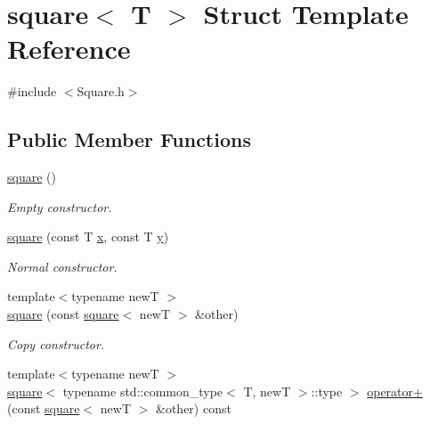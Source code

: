 \hypertarget{structsquare}{}\section{square$<$ T $>$ Struct Template Reference}
\label{structsquare}


{\ttfamily \#include $<$Square.\+h$>$}

\subsection*{Public Member Functions}
\begin{DoxyCompactItemize}
\item 
\mbox{\label{structsquare_a671bc7b982fc848ab1222ead8512469e}} 
\hyperlink{structsquare_a671bc7b982fc848ab1222ead8512469e}{square} ()
\begin{DoxyCompactList}\small\item\em Empty constructor. \end{DoxyCompactList}\item 
\mbox{\label{structsquare_a447dd893d605937230bba2861322df6d}} 
\hyperlink{structsquare_a447dd893d605937230bba2861322df6d}{square} (const T \hyperlink{structsquare_a9a6e49424fdfad5fe4ce893bb57ba467}{x}, const T \hyperlink{structsquare_a7b976f9389a2fc271a332b5014dfd1e9}{y})
\begin{DoxyCompactList}\small\item\em Normal constructor. \end{DoxyCompactList}\item 
\mbox{\label{structsquare_a3ae63c51c5ae7e6416d94febdfabdba1}} 
{\footnotesize template$<$typename newT $>$ }\\\hyperlink{structsquare_a3ae63c51c5ae7e6416d94febdfabdba1}{square} (const \hyperlink{structsquare}{square}$<$ newT $>$ \&other)
\begin{DoxyCompactList}\small\item\em Copy constructor. \end{DoxyCompactList}\item 
\mbox{\label{structsquare_a1379df16b796073695499c59164634a7}} 
{\footnotesize template$<$typename newT $>$ }\\\hyperlink{structsquare}{square}$<$ typename std\+::common\+\_\+type$<$ T, newT $>$\+::type $>$ \hyperlink{structsquare_a1379df16b796073695499c59164634a7}{operator+} (const \hyperlink{structsquare}{square}$<$ newT $>$ \&other) const

\end{DoxyCompactItemize}
